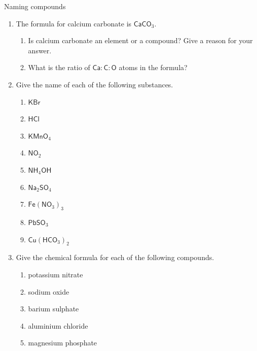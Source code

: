   \label{m38708*secfhsst!!!underscore!!!id255}
            \begin{exercises}{Naming compounds}
{            \nopagebreak
      \label{m38708*id65118}\begin{enumerate}[noitemsep, label=\textbf{\arabic*}. ] 
            \label{m38708*uid47}\item The formula for calcium carbonate is $\mathsf{CaCO}{}_{3}$.
\label{m38708*id65148}\begin{enumerate}[noitemsep, label=\textbf{\alph*}. ] 
            \label{m38708*uid48}\item Is calcium carbonate an element or a compound? Give a reason for your answer.
\label{m38708*uid49}\item What is the ratio of $\mathsf{Ca}:\mathsf{C}:\mathsf{O}$ atoms in the formula?
\end{enumerate}
\label{m38708*uid50}\item Give the name of each of the following substances.
\label{m38708*id65189}\begin{enumerate}[noitemsep, label=\textbf{\alph*}. ] 
            \label{m38708*uid51}\item $\mathsf{KBr}$
\label{m38708*uid52}\item $\mathsf{HCl}$
\label{m38708*uid53}\item ${\mathsf{KMnO}}_{4}$\label{m38708*uid54}\item ${\mathsf{NO}}_{2}$\label{m38708*uid55}\item ${\mathsf{NH}}_{4}\mathsf{OH}$
\label{m38708*uid56}\item ${\mathsf{Na}}_{2}{\mathsf{SO}}_{4}$
\item ${\mathsf{Fe}}({\mathsf{NO}}_{3})_3$
\item ${\mathsf{Pb}}{\mathsf{SO}}_{3}$
\item ${\mathsf{Cu}}({\mathsf{HCO}}_{3})_2$
\end{enumerate}
\label{m38708*uid57}\item Give the chemical formula for each of the following compounds.
\label{m38708*id65338}\begin{enumerate}[noitemsep, label=\textbf{\alph*}. ] 
            \label{m38708*uid58}\item potassium nitrate
\label{m38708*uid59}\item sodium oxide
\label{m38708*uid60}\item barium sulphate
\label{m38708*uid61}\item aluminium chloride
\label{m38708*uid62}\item magnesium phosphate

\end{enumerate}
\end{enumerate}}
\end{exercises}

